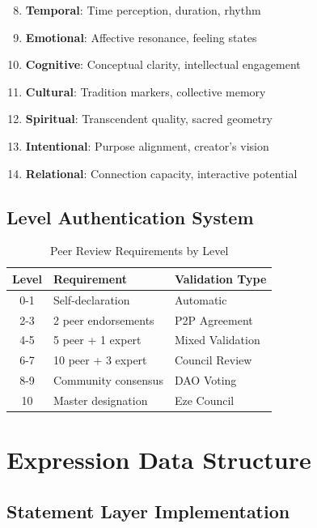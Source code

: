 \documentclass[12pt,a4paper]{report}
\theoremstyle{definition}
\begin{document}
\begin{enumerate}
    \setcounter{enumi}{7}
    \item \textbf{Temporal}: Time perception, duration, rhythm
    \item \textbf{Emotional}: Affective resonance, feeling states
    \item \textbf{Cognitive}: Conceptual clarity, intellectual engagement
    \item \textbf{Cultural}: Tradition markers, collective memory
    \item \textbf{Spiritual}: Transcendent quality, sacred geometry
    \item \textbf{Intentional}: Purpose alignment, creator's vision
    \item \textbf{Relational}: Connection capacity, interactive potential
\end{enumerate}

\section{Level Authentication System}

\begin{table}[h]
\centering
\caption{Peer Review Requirements by Level}
\begin{tabular}{|c|l|l|}
\hline
\textbf{Level} & \textbf{Requirement} & \textbf{Validation Type} \\
\hline
0-1 & Self-declaration & Automatic \\
2-3 & 2 peer endorsements & P2P Agreement \\
4-5 & 5 peer + 1 expert & Mixed Validation \\
6-7 & 10 peer + 3 expert & Council Review \\
8-9 & Community consensus & DAO Voting \\
10 & Master designation & Eze Council \\
\hline
\end{tabular}
\end{table}

\chapter{Expression Data Structure}

\section{Statement Layer Implementation}
\end{document}
